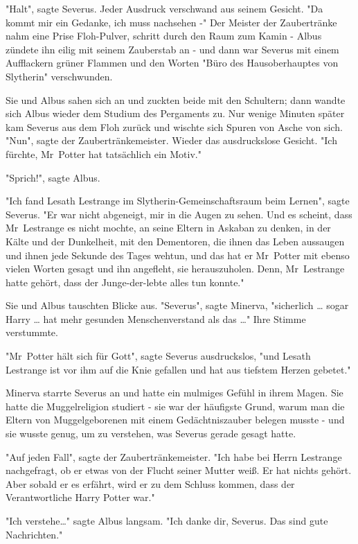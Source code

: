 {"Halt", sagte Severus. Jeder Ausdruck verschwand aus seinem Gesicht. "Da kommt mir ein Gedanke, ich muss nachsehen -" Der Meister der Zaubertränke nahm eine Prise Floh-Pulver, schritt durch den Raum zum Kamin - Albus zündete ihn eilig mit seinem Zauberstab an - und dann war Severus mit einem Aufflackern grüner Flammen und den Worten "Büro des Hausoberhauptes von Slytherin" verschwunden.

Sie und Albus sahen sich an und zuckten beide mit den Schultern; dann wandte sich Albus wieder dem Studium des Pergaments zu. Nur wenige Minuten später kam Severus aus dem Floh zurück und wischte sich Spuren von Asche von sich. "Nun", sagte der Zaubertränkemeister. Wieder das ausdruckslose Gesicht. "Ich fürchte, Mr~Potter hat tatsächlich ein Motiv."

"Sprich!", sagte Albus.

"Ich fand Lesath Lestrange im Slytherin-Gemeinschaftsraum beim Lernen", sagte Severus. "Er war nicht abgeneigt, mir in die Augen zu sehen. Und es scheint, dass Mr~Lestrange es nicht mochte, an seine Eltern in Askaban zu denken, in der Kälte und der Dunkelheit, mit den Dementoren, die ihnen das Leben aussaugen und ihnen jede Sekunde des Tages wehtun, und das hat er Mr~Potter mit ebenso vielen Worten gesagt und ihn angefleht, sie herauszuholen. Denn, Mr~Lestrange hatte gehört, dass der Junge-der-lebte alles tun konnte."

Sie und Albus tauschten Blicke aus. "Severus", sagte Minerva, "sicherlich … sogar Harry … hat mehr gesunden Menschenverstand als das …" Ihre Stimme verstummte.

"Mr~Potter hält sich für Gott", sagte Severus ausdruckslos, "und Lesath Lestrange ist vor ihm auf die Knie gefallen und hat aus tiefstem Herzen gebetet."

Minerva starrte Severus an und hatte ein mulmiges Gefühl in ihrem Magen. Sie hatte die Muggelreligion studiert - sie war der häufigste Grund, warum man die Eltern von Muggelgeborenen mit einem Gedächtniszauber belegen musste - und sie wusste genug, um zu verstehen, was Severus gerade gesagt hatte.

"Auf jeden Fall", sagte der Zaubertränkemeister. "Ich habe bei Herrn Lestrange nachgefragt, ob er etwas von der Flucht seiner Mutter weiß. Er hat nichts gehört. Aber sobald er es erfährt, wird er zu dem Schluss kommen, dass der Verantwortliche Harry Potter war."

"Ich verstehe…" sagte Albus langsam. "Ich danke dir, Severus. Das sind gute Nachrichten."

}
